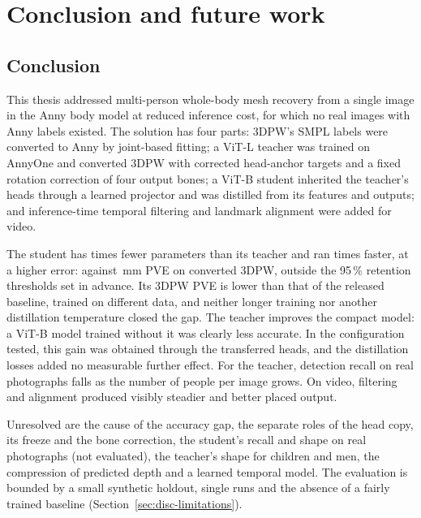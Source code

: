 \chapter{Conclusion and future work}
\label{ch:conclusion}

\section{Conclusion}
\label{sec:concl}

This thesis addressed multi-person whole-body mesh recovery from a single image in the Anny body model at reduced
inference cost, for which no real images with Anny labels existed. The solution has four parts: 3DPW's SMPL
labels were converted to Anny by joint-based fitting; a ViT-L teacher was trained on AnnyOne and converted 3DPW
with corrected head-anchor targets and a fixed rotation correction of four output bones; a ViT-B student
inherited the teacher's heads through a learned projector and was distilled from its features and outputs; and
inference-time temporal filtering and landmark alignment were added for video.

The student has \ParamRatioStudent{} times fewer parameters than its teacher and ran \SpeedRatioStudent{} times
faster, at a higher error: \StudentThreeDPW{} against \FinalThreeDPW\,mm PVE on converted 3DPW, outside the
95\,\% retention thresholds set in advance. Its 3DPW PVE is lower than that of the released baseline, trained
on different data, and neither longer training nor another distillation temperature closed the gap. The teacher
improves the compact model: a ViT-B model trained without it was clearly less accurate. In the configuration tested,
this gain was obtained through the transferred heads, and the distillation losses added no measurable further
effect.
For the teacher, detection recall on real photographs falls as the number of people per image grows.
On video, filtering and alignment produced visibly steadier and better placed output.

Unresolved are the cause of the accuracy gap, the separate roles of the head copy, its freeze and the bone
correction, the student's recall and shape on real photographs (not evaluated), the teacher's shape for children and men,
the compression of predicted depth and a learned temporal model. The evaluation is bounded by a small synthetic holdout, single runs and the absence of a fairly
trained baseline (Section~\ref{sec:disc-limitations}).

